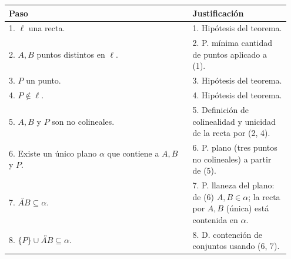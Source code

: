\documentclass[12pt,letterpaper]{exam}
\begin{document}
\begin{enumerate}[label=\alph*)]
\begin{center}
\begin{tabular}{|p{0.62\linewidth}|p{0.33\linewidth}|}
\hline
\textbf{Paso} & \textbf{Justificación} \\ \hline
1. $\ell$ una recta. & 1. Hipótesis del teorema. \\ \hline
2. $A, B$ puntos distintos en $\ell$. & 2. P. mínima cantidad de puntos aplicado a (1). \\ \hline
3. $P$ un punto. & 3. Hipótesis del teorema. \\ \hline
4. $P \notin \ell$. & 4. Hipótesis del teorema. \\ \hline
5. $A, B$ y $P$ son no colineales. & 5. Definición de colinealidad y unicidad de la recta por (2, 4). \\ \hline
6. Existe un único plano $\alpha$ que contiene a $A, B$ y $P$. & 6. P. plano (tres puntos no colineales) a partir de (5). \\ \hline
\vspace{0.001em}
7. $\overleftrightarrow{AB} \subseteq \alpha$. & 7. P. llaneza del plano: de (6) $A,B\in\alpha$; la recta por $A,B$ (única) está contenida en $\alpha$. \\ \hline
\vspace{0.001em}
8. $\{P\} \cup \overleftrightarrow{AB} \subseteq \alpha$. & 8. D. contención de conjuntos usando (6, 7). \\ \hline
\end{tabular}
\end{center}
\vspace{1em}



\end{enumerate} %
\end{document}
